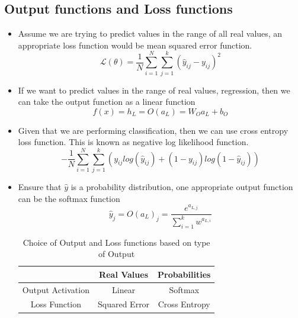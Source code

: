 \documentclass[a4paper]{article}
\begin{document}
\subsection{Output functions and Loss functions}
\begin{itemize}
    \item Assume we are trying to predict values in the range of all real values, an appropriate loss function would be mean squared error function.
    \begin{equation*}
        \mathcal{L}(\theta)=\frac{1}{N}\sum_{i=1}^N\sum_{j=1}^k(\hat{y}_{ij}-y_{ij})^2
    \end{equation*}
    \item If we want to predict values in the range of real values, regression, then we can take the output function as a linear function
    \begin{equation*}
        f(x)=h_L=O(a_L)=W_Oa_L+b_O
    \end{equation*}
    \item Given that we are performing classification, then we can use cross entropy loss function. This is known as negative log likelihood function.
    \begin{equation*}
        -\frac{1}{N}\sum_{i=1}^N\sum_{j=1}^k(y_{ij}log(\hat{y}_{ij}) + (1-y_{ij})log(1-\hat{y}_{ij}))
    \end{equation*}
    \item Ensure that $\hat{y}$ is a probability distribution, one appropriate output function can be the softmax function
    \begin{equation*}
        \hat{y}_j=O(a_L)_j=\frac{e^{a_{L,j}}}{\sum_{i=1}^kw^{a_{L,i}}}
    \end{equation*}
    \begin{table}[H]
        \centering
        \begin{tabular}{|c|c|c|}
            \hline
             & Real Values & Probabilities \\
             \hline
            Output Activation & Linear & Softmax\\
            \hline
            Loss Function & Squared Error & Cross Entropy\\
            \hline
        \end{tabular}
        \caption{Choice of Output and Loss functions based on type of Output}
    \end{table}
\end{itemize}
\pagebreak
\end{document}
